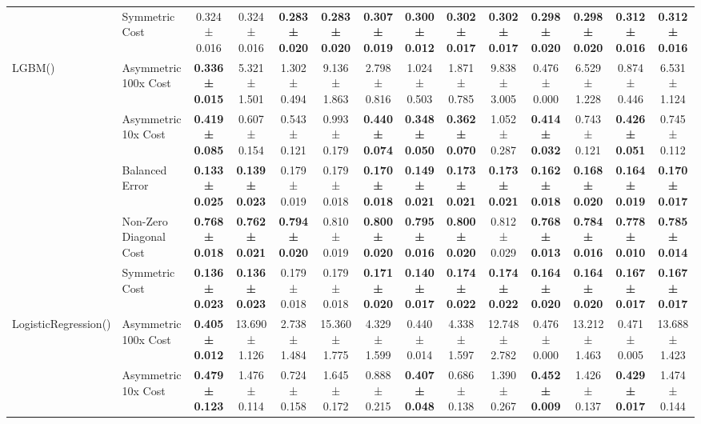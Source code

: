 \begin{table}[H]
{\begin{tabular}{llcccccccccccc}
 & Symmetric Cost & 0.324 ± 0.016 & 0.324 ± 0.016 & \textbf{0.283 ± 0.020} & \textbf{0.283 ± 0.020} & \textbf{0.307 ± 0.019} & \textbf{0.300 ± 0.012} & \textbf{0.302 ± 0.017} & \textbf{0.302 ± 0.017} & \textbf{0.298 ± 0.020} & \textbf{0.298 ± 0.020} & \textbf{0.312 ± 0.016} & \textbf{0.312 ± 0.016} \\
\cline{1-14}
\multirow[t]{5}{*}{LGBM()} & Asymmetric 100x Cost & \textbf{0.336 ± 0.015} & 5.321 ± 1.501 & 1.302 ± 0.494 & 9.136 ± 1.863 & 2.798 ± 0.816 & 1.024 ± 0.503 & 1.871 ± 0.785 & 9.838 ± 3.005 & 0.476 ± 0.000 & 6.529 ± 1.228 & 0.874 ± 0.446 & 6.531 ± 1.124 \\
 & Asymmetric 10x Cost & \textbf{0.419 ± 0.085} & 0.607 ± 0.154 & 0.543 ± 0.121 & 0.993 ± 0.179 & \textbf{0.440 ± 0.074} & \textbf{0.348 ± 0.050} & \textbf{0.362 ± 0.070} & 1.052 ± 0.287 & \textbf{0.414 ± 0.032} & 0.743 ± 0.121 & \textbf{0.426 ± 0.051} & 0.745 ± 0.112 \\
 & Balanced Error & \textbf{0.133 ± 0.025} & \textbf{0.139 ± 0.023} & 0.179 ± 0.019 & 0.179 ± 0.018 & \textbf{0.170 ± 0.018} & \textbf{0.149 ± 0.021} & \textbf{0.173 ± 0.021} & \textbf{0.173 ± 0.021} & \textbf{0.162 ± 0.018} & \textbf{0.168 ± 0.020} & \textbf{0.164 ± 0.019} & \textbf{0.170 ± 0.017} \\
 & Non-Zero Diagonal Cost & \textbf{0.768 ± 0.018} & \textbf{0.762 ± 0.021} & \textbf{0.794 ± 0.020} & 0.810 ± 0.019 & \textbf{0.800 ± 0.020} & \textbf{0.795 ± 0.016} & \textbf{0.800 ± 0.020} & 0.812 ± 0.029 & \textbf{0.768 ± 0.013} & \textbf{0.784 ± 0.016} & \textbf{0.778 ± 0.010} & \textbf{0.785 ± 0.014} \\
 & Symmetric Cost & \textbf{0.136 ± 0.023} & \textbf{0.136 ± 0.023} & 0.179 ± 0.018 & 0.179 ± 0.018 & \textbf{0.171 ± 0.020} & \textbf{0.140 ± 0.017} & \textbf{0.174 ± 0.022} & \textbf{0.174 ± 0.022} & \textbf{0.164 ± 0.020} & \textbf{0.164 ± 0.020} & \textbf{0.167 ± 0.017} & \textbf{0.167 ± 0.017} \\
\cline{1-14}
\multirow[t]{5}{*}{LogisticRegression()} & Asymmetric 100x Cost & \textbf{0.405 ± 0.012} & 13.690 ± 1.126 & 2.738 ± 1.484 & 15.360 ± 1.775 & 4.329 ± 1.599 & 0.440 ± 0.014 & 4.338 ± 1.597 & 12.748 ± 2.782 & 0.476 ± 0.000 & 13.212 ± 1.463 & 0.471 ± 0.005 & 13.688 ± 1.423 \\
 & Asymmetric 10x Cost & \textbf{0.479 ± 0.123} & 1.476 ± 0.114 & 0.724 ± 0.158 & 1.645 ± 0.172 & 0.888 ± 0.215 & \textbf{0.407 ± 0.048} & 0.686 ± 0.138 & 1.390 ± 0.267 & \textbf{0.452 ± 0.009} & 1.426 ± 0.137 & \textbf{0.429 ± 0.017} & 1.474 ± 0.144 \\

\end{tabular}}
\end{table}
